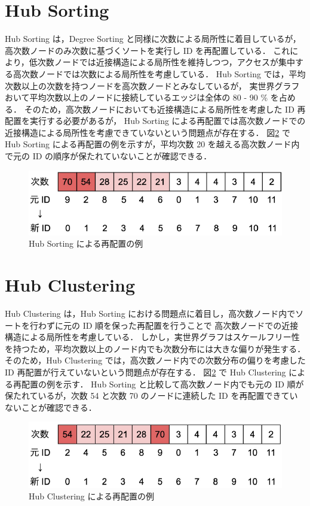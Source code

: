 \section{Hub Sorting}
Hub Sorting \cite{zhang2017making} は，Degree Sorting と同様に次数による局所性に着目しているが，高次数ノードのみ次数に基づくソートを実行し ID を再配置している．
これにより，低次数ノードでは近接構造による局所性を維持しつつ，アクセスが集中する高次数ノードでは次数による局所性を考慮している．
Hub Sorting では，平均次数以上の次数を持つノードを高次数ノードとみなしているが，
実世界グラフおいて平均次数以上のノードに接続しているエッジは全体の 80 - 90 \% を占める\cite{faldu2019closer}．
そのため，高次数ノードにおいても近接構造による局所性を考慮した ID 再配置を実行する必要があるが，
Hub Sorting による再配置では高次数ノードでの近接構造による局所性を考慮できていないという問題点が存在する．
図\ref{hubclustering} で Hub Sorting による再配置の例を示すが，平均次数 20 を越える高次数ノード内で元の ID の順序が保たれていないことが確認できる．
\begin{figure}[t]
  \centering
  \includegraphics[width=\linewidth]{./figure/hubsorting.pdf}
  \caption{Hub Sorting による再配置の例}
  \label{hubsorting}
\end{figure}
\section{Hub Clustering}
Hub Clustering \cite{balaji2018graph} は，Hub Sorting における問題点に着目し，高次数ノード内でソートを行わずに元の ID 順を保った再配置を行うことで
高次数ノードでの近接構造による局所性を考慮している．
しかし，実世界グラフはスケールフリー性を持つため，平均次数以上のノード内でも次数分布には大きな偏りが発生する．
そのため，Hub Clustering では，高次数ノード内での次数分布の偏りを考慮した ID 再配置が行えていないという問題点が存在する．
図\ref{hubclustering} で Hub Clustering による再配置の例を示す．
Hub Sorting と比較して高次数ノード内でも元の ID 順が保たれているが，次数 54 と次数 70 のノードに連続した ID を再配置できていないことが確認できる．
\begin{figure}[t]
  \centering
  \includegraphics[width=\linewidth]{./figure/hubclustering.pdf}
  \caption{Hub Clustering による再配置の例}
  \label{hubclustering}
\end{figure}
